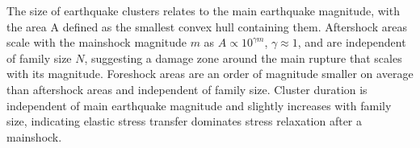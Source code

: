 \documentclass[12pt]{article} %
\theoremstyle{plain}
\begin{document}

	The size of earthquake clusters relates to the main earthquake magnitude, with the area A defined as the smallest convex hull containing them. Aftershock areas scale with the mainshock magnitude $m$ as $A \propto 10^{\gamma m}$, $\gamma \approx 1$, and are independent of family size $N$, suggesting a damage zone around the main rupture that scales with its magnitude. Foreshock areas are an order of magnitude smaller on average than aftershock areas and independent of family size. Cluster duration is independent of main earthquake magnitude and slightly increases with family size, indicating elastic stress transfer dominates stress relaxation after a mainshock.
	
	
\end{document}

